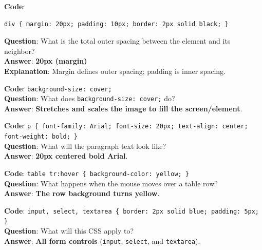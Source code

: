 \begin{quizbox}
\textbf{Code}:
\begin{lstlisting}[language=HTML]
div { margin: 20px; padding: 10px; border: 2px solid black; }
\end{lstlisting}
\textbf{Question}: What is the total outer spacing between the element and its neighbor?\\
\textbf{Answer}: \textbf{20px (margin)}\\
\textbf{Explanation}: Margin defines outer spacing; padding is inner spacing.
\end{quizbox}

\begin{quizbox}
\textbf{Code}: \texttt{background-size: cover;}\\
\textbf{Question}: What does \texttt{background-size: cover;} do?\\
\textbf{Answer}: \textbf{Stretches and scales the image to fill the screen/element}.
\end{quizbox}

\begin{quizbox}
\textbf{Code}: \texttt{p \{ font-family: Arial; font-size: 20px; text-align: center; font-weight: bold; \}}\\
\textbf{Question}: What will the paragraph text look like?\\
\textbf{Answer}: \textbf{20px centered bold Arial}.
\end{quizbox}

\begin{quizbox}
\textbf{Code}: \texttt{table tr:hover \{ background-color: yellow; \}}\\
\textbf{Question}: What happens when the mouse moves over a table row?\\
\textbf{Answer}: \textbf{The row background turns yellow}.
\end{quizbox}

\begin{quizbox}
\textbf{Code}: \texttt{input, select, textarea \{ border: 2px solid blue; padding: 5px; \}}\\
\textbf{Question}: What will this CSS apply to?\\
\textbf{Answer}: \textbf{All form controls} (\texttt{input}, \texttt{select}, and \texttt{textarea}).
\end{quizbox}


